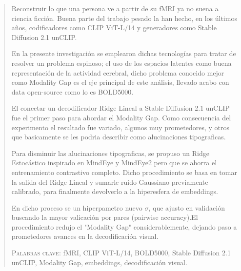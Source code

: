 \documentclass[12pt,spanish, singlespacing, openany]{MastersDoctoralThesis}
\newcommand\blankpage{%
    \null
    \thispagestyle{empty}%
    \addtocounter{page}{0}%
    \newpage}
\begin{document}
\begin{abstract}
\addchaptertocentry{\abstractname}

Reconstruir lo que una persona ve a partir de su fMRI ya no suena a ciencia
ficción. Buena parte del trabajo pesado la han hecho, en los últimos años,
codificadores como CLIP ViT-L/14 y generadores como Stable Diffusion 2.1
unCLIP. 

En la presente investigación se emplearon dichas tecnologías para tratar de resolver
un problema espinoso; el uso de los espacios latentes como buena representación
de la actividad cerebral, dicho problema conocido mejor como Modality Gap es el eje
principal de este análisis, llevado acabo con data open-source como lo es BOLD5000.

El conectar un decodificador Ridge Lineal a Stable Diffusion 2.1 unCLIP 
fue el primer paso para abordar el Modality Gap. Como consecuencia del experimento el 
resultado fue variado, algunos muy prometedores, y otros que basicamente se les 
podria describir como alucinaciones tipograficas.

Para disminuir las alucinaciones tipograficas, se propuso un Ridge Estocástico 
inspirado en MindEye y MindEye2 pero que se ahorra el entrenamiento contrastivo completo.
Dicho procedimiento se basa en tomar la salida del Ridge Lineal y sumarle ruido Gaussiano 
previamente calibrado, para finalmente devolverlo a la hiperesfera de embeddings.

En dicho proceso se un hiperpametro nuevo $\sigma$, que ajusto en validación buscando
la mayor valicación por pares (pairwise accuracy).El procedimiento redujo el "Modality 
Gap" considerablemente, dejando paso a prometedores avances en la decodificación visual. 

\textsc{Palabras clave:} fMRI, CLIP ViT-L/14, BOLD5000, Stable Diffusion 2.1 unCLIP, 
Modality Gap, embeddings, decodificación visual.

\end{abstract}

\clearpage
\afterpage{\blankpage}
\clearpage
\tableofcontents

\newpage
\listoffigures

\afterpage{\blankpage}
\newpage
\listoftables

\afterpage{\blankpage}
\newpage
\listofmyequations

\afterpage{\blankpage}
\lstlistoflistings
\end{document}
